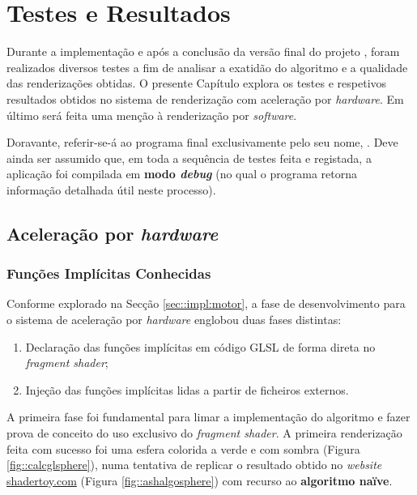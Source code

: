 \chapter{Testes e Resultados}
\label{ch::testes}


Durante a implementação e após a conclusão da versão final do projeto \theapp, foram realizados diversos testes a fim de analisar a exatidão do algoritmo e a qualidade das renderizações obtidas. O presente Capítulo explora os testes e respetivos resultados obtidos no sistema de renderização com aceleração por \textit{hardware}. Em último será feita uma menção à renderização por \textit{software}.

Doravante, referir-se-á ao programa final exclusivamente pelo seu nome, \theapp. Deve ainda ser assumido que, em toda a sequência de testes feita e registada, a aplicação foi compilada em \textbf{modo \textit{debug}} (no qual o programa retorna informação detalhada útil neste processo).


\section{Aceleração por \textit{hardware}}
\label{sec::testes:hardware}

\subsection{Funções Implícitas Conhecidas}
\label{ssec::testes:hardware:dev}

Conforme explorado na Secção \ref{sec::impl:motor}, a fase de desenvolvimento para o sistema de aceleração por \textit{hardware} englobou duas fases distintas:
\begin{enumerate}
	\item Declaração das funções implícitas em código \acs{GLSL} de forma direta no \textit{fragment shader};
	\item Injeção das funções implícitas lidas a partir de ficheiros externos.
\end{enumerate}

A primeira fase foi fundamental para limar a implementação do algoritmo e fazer prova de conceito do uso exclusivo do \textit{fragment shader}. A primeira renderização feita com sucesso foi uma esfera colorida a verde e com sombra (Figura \ref{fig::calcglsphere}), numa tentativa de replicar o resultado obtido no \textit{website} \url{shadertoy.com} (Figura \ref{fig::ashalgosphere}) com recurso ao \textbf{algoritmo naïve}.

